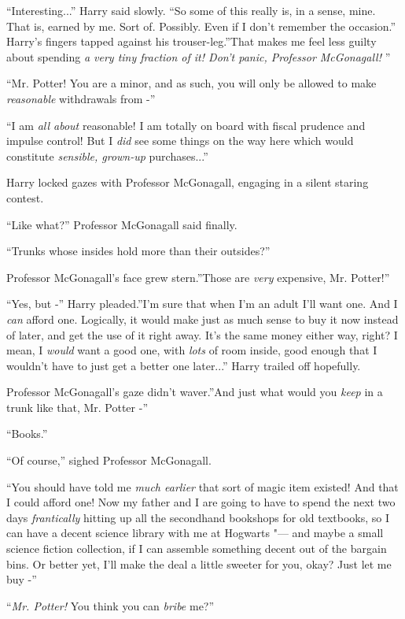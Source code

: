 ``Interesting...'' Harry said slowly. ``So some of this really is,
in a sense, mine. That is, earned by me. Sort of. Possibly. Even if I
don't remember the occasion.'' Harry's fingers tapped against his
trouser-leg.''That makes me feel less guilty about spending \emph{a very
tiny fraction of it! Don't panic, Professor McGonagall!} ''

``Mr. Potter! You are a minor, and as such, you will only be allowed to
make \emph{reasonable} withdrawals from -''

``I am \emph{all about} reasonable! I am totally on board with fiscal
prudence and impulse control! But I \emph{did} see some things on the
way here which would constitute \emph{sensible, grown-up}
purchases...''

Harry locked gazes with Professor McGonagall, engaging in a silent
staring contest.

``Like what?'' Professor McGonagall said finally.

``Trunks whose insides hold more than their outsides?''

Professor McGonagall's face grew stern.''Those are \emph{very}
expensive, Mr. Potter!''

``Yes, but -'' Harry pleaded.''I'm sure that when I'm an adult I'll want
one. And I \emph{can} afford one. Logically, it would make just as much
sense to buy it now instead of later, and get the use of it right away.
It's the same money either way, right? I mean, I \emph{would} want a
good one, with \emph{lots} of room inside, good enough that I wouldn't
have to just get a better one later...'' Harry trailed off
hopefully.

Professor McGonagall's gaze didn't waver.''And just what would you
\emph{keep} in a trunk like that, Mr. Potter -''

``Books.''

``Of course,'' sighed Professor McGonagall.

``You should have told me \emph{much earlier} that sort of magic item
existed! And that I could afford one! Now my father and I are going to
have to spend the next two days \emph{frantically} hitting up all the
secondhand bookshops for old textbooks, so I can have a decent science
library with me at Hogwarts "--- and maybe a small science fiction
collection, if I can assemble something decent out of the bargain bins.
Or better yet, I'll make the deal a little sweeter for you, okay? Just
let me buy -''

``\emph{Mr. Potter!} You think you can \emph{bribe} me?''

